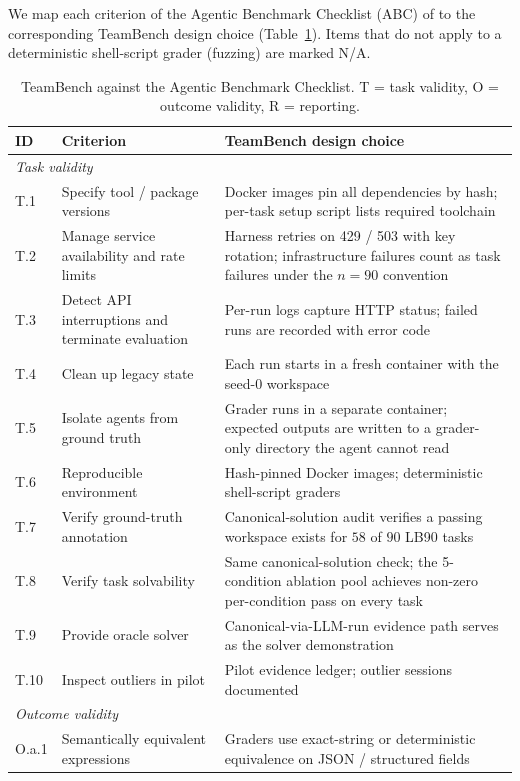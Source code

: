 \documentclass{article}
\begin{document}
We map each criterion of the Agentic Benchmark Checklist (ABC) of \citet{zhu2025abc} to the corresponding TeamBench design choice (Table~\ref{tab:abc}). Items that do not apply to a deterministic shell-script grader (fuzzing) are marked N/A.

\begin{table}[h]
\centering
\small
\setlength{\tabcolsep}{4pt}
\caption{TeamBench against the Agentic Benchmark Checklist. T = task validity, O = outcome validity, R = reporting.}
\label{tab:abc}
\begin{tabular}{p{0.7cm}p{4.6cm}p{8.5cm}}
\toprule
ID & Criterion & TeamBench design choice \\
\midrule
\multicolumn{3}{l}{\textit{Task validity}} \\
T.1 & Specify tool / package versions & Docker images pin all dependencies by hash; per-task setup script lists required toolchain \\
T.2 & Manage service availability and rate limits & Harness retries on 429 / 503 with key rotation; infrastructure failures count as task failures under the $n=90$ convention \\
T.3 & Detect API interruptions and terminate evaluation & Per-run logs capture HTTP status; failed runs are recorded with error code \\
T.4 & Clean up legacy state & Each run starts in a fresh container with the seed-0 workspace \\
T.5 & Isolate agents from ground truth & Grader runs in a separate container; expected outputs are written to a grader-only directory the agent cannot read \\
T.6 & Reproducible environment & Hash-pinned Docker images; deterministic shell-script graders \\
T.7 & Verify ground-truth annotation & Canonical-solution audit verifies a passing workspace exists for $58$ of $90$ LB90 tasks \\
T.8 & Verify task solvability & Same canonical-solution check; the 5-condition ablation pool achieves non-zero per-condition pass on every task \\
T.9 & Provide oracle solver & Canonical-via-LLM-run evidence path serves as the solver demonstration \\
T.10 & Inspect outliers in pilot & Pilot evidence ledger; outlier sessions documented \\
\midrule
\multicolumn{3}{l}{\textit{Outcome validity}} \\
O.a.1 & Semantically equivalent expressions & Graders use exact-string or deterministic equivalence on JSON / structured fields \\

\end{tabular}
\end{table}
\end{document}

